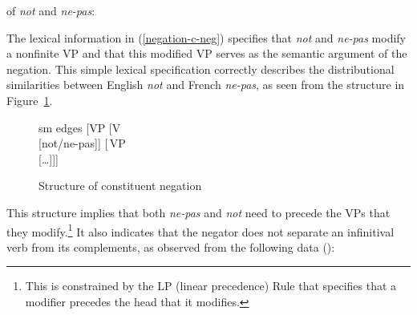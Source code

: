 \documentclass[output=paper
                ,modfonts
                ,nonflat
	        ,collection
	        ,collectionchapter
	        ,collectiontoclongg
 	        ,biblatex
                ,babelshorthands
                ,newtxmath
                ,draftmode
                ,colorlinks, citecolor=brown
]{./langsci/langscibook}
\begin{document}
{\begin{exe}
\begin{xlist}
\begin{exe}
\begin{xlist}
\ea
\label{negation-c-neg}
\localvs of \emph{not} and \emph{ne-pas}:\\
\z


\noindent %
The lexical information in (\ref{negation-c-neg}) specifies that
\textit{not} and \textit{ne-pas} modify a nonfinite VP and that this
modified VP serves as the semantic argument of the negation.
This simple lexical specification correctly describes the
distributional similarities between English \textit{not} and French
\textit{ne-pas}, as seen from the structure in Figure~\ref{negation-not-vp-mod}.

\begin{figure}
	\begin{forest}
		sm edges
		[VP
			[V\\
					[not/ne-pas]]
			[\,VP\\
					[\ldots]]]
	\end{forest}
\caption{Structure of constituent negation}\label{negation-not-vp-mod}
\end{figure}
\noindent
This structure implies that
both \textit{ne-pas} and \textit{not} need to precede the VPs that they modify.\footnote{
This is constrained by the LP (linear precedence) Rule that specifies
that a modifier precedes the head that it modifies.}  It also
indicates that the negator does not separate an infinitival verb
from its complements, as observed from the following data (\citealp[]{KS:02}):

\eal
{} \label{negation-35a}
 \label{negation-35b}
\zl

\eal
{} \label{negation-34a}
 \label{negation-34b}
\zl




\end{xlist}
\end{exe}
\end{xlist}
\end{exe}}
\end{document}
